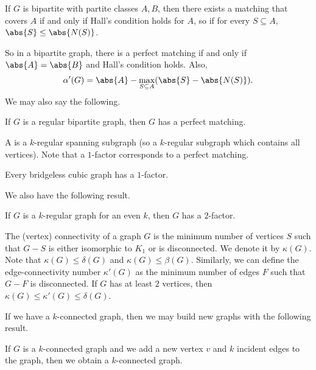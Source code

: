 \begin{theorem}[Hall]
  If $G$ is bipartite with partite classes $A, B$, then there exists a matching
  that covers $A$ if and only if Hall's condition holds for $A$, so if for every
  $S \subseteq A$, $\abs{S} \le \abs{N(S)}$.
\end{theorem}

So in a bipartite graph, there is a perfect matching if and only if $\abs{A} =
\abs{B}$ and Hall's condition holds.
Also,
\[
  \alpha'(G) = \abs{A} - \max_{S \subseteq A} (\abs{S} - \abs{N(S)}).
\]
We may also say the following.

\begin{theorem}
  If $G$ is a regular bipartite graph, then $G$ has a perfect matching.
\end{theorem}


A  is a $k$-regular spanning subgraph (so a $k$-regular
subgraph which contains all vertices).
Note that a $1$-factor corresponds to a perfect matching.

\begin{theorem}[Petersen]
  Every bridgeless cubic graph has a $1$-factor.
\end{theorem}

We also have the following result.

\begin{theorem}
  If $G$ is a $k$-regular graph for an even $k$, then $G$ has a $2$-factor.
\end{theorem}


The (vertex) connectivity of a graph $G$ is the minimum number of vertices $S$
such that $G-S$ is either isomorphic to $K_1$ or is disconnected.
We denote it by $\kappa(G)$.
Note that $\kappa(G) \le \delta(G)$ and $\kappa(G) \le \beta(G)$.
Similarly, we can define the edge-connectivity number $\kappa'(G)$ as the
minimum number of edges $F$ such that $G -F$ is disconnected.
If $G$ has at least $2$ vertices, then $\kappa(G) \le \kappa'(G) \le \delta(G)$.

If we have a $k$-connected graph, then we may build new graphs with the
following result.

\begin{theorem}
  If $G$ is a $k$-connected graph and we add a new vertex $v$ and $k$ incident
  edges to the graph, then we obtain a $k$-connected graph.
\end{theorem}

